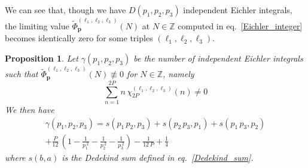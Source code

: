 \documentclass[12pt,reqno]{amsart}
\numberwithin{equation}{section}
\newtheorem{prop}[theorem]{Proposition}
\begin{document}
We can see that,
though we have  $D(p_1, p_2, p_3)$ independent Eichler integrals,
the  limiting value
$\widetilde{\Phi}_{\boldsymbol{p}}^{(\ell_1, \ell_2, \ell_3)}(N)$
at  $N\in \mathbb{Z}$
computed in eq.~\eqref{Eichler_integer}
becomes identically  zero for some triples $(\ell_1,\ell_2,\ell_3)$.


\begin{prop}
  Let  $\gamma(p_1,p_2,p_3)$  be
  the number of
  independent Eichler integrals
  such that
  $\widetilde{\Phi}_{\boldsymbol{p}}^{(\ell_1,\ell_2,\ell_3)}(N) \not\equiv 0$
  for $N\in\mathbb{Z}$, namely
  \begin{equation}
    \label{zero_condition}
    \sum_{n=1}^{2 P} n \, 
    \chi_{2 P}^{(\ell_1,\ell_2,\ell_3)}(n)
    \neq 0
  \end{equation}
  We then have
  \begin{multline}
    \label{value_gamma}
    \gamma(p_1, p_2, p_3)
    =
    s(p_1 \, p_2, p_3)+    s(p_2 \, p_3, p_1)+    s(p_1 \, p_3, p_2)
    \\
    +
    \frac{P}{12} \,
    \left(
      1-
      \frac{1}{p_1^{~2}}
      -   \frac{1}{p_2^{~2}}
      -  \frac{1}{p_3^{~2}}
    \right)
    -\frac{1}{12  \, P}
    +
    \frac{1}{4}
  \end{multline}
  where $s(b,a)$ is the Dedekind sum defined in eq.~\eqref{Dedekind_sum}.
\end{prop}
\end{document}
